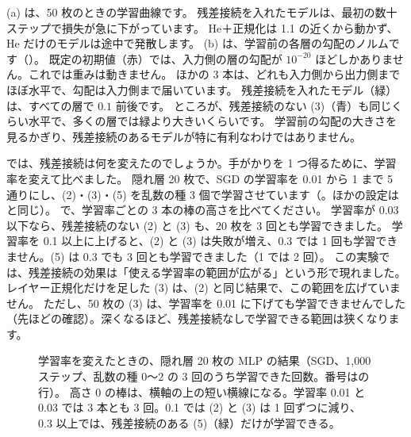 (a) は、50 枚のときの学習曲線です。
残差接続を入れたモデルは、最初の数十ステップで損失が急に下がっています。
He＋正規化は 1.1 の近くから動かず、He だけのモデルは途中で発散します。
(b) は、学習前の各層の勾配のノルムです（）。
既定の初期値（赤）では、入力側の層の勾配が $10^{-20}$ ほどしかありません。これでは重みは動きません。
ほかの 3 本は、どれも入力側から出力側までほぼ水平で、勾配は入力側まで届いています。
残差接続を入れたモデル（緑）は、すべての層で $0.1$ 前後です。
ところが、残差接続のない (3)（青）も同じくらい水平で、多くの層では緑より大きいくらいです。
学習前の勾配の大きさを見るかぎり、残差接続のあるモデルが特に有利なわけではありません。

では、残差接続は何を変えたのでしょうか。手がかりを 1 つ得るために、学習率を変えて比べました。
隠れ層 20 枚で、SGD の学習率を 0.01 から 1 まで 5 通りにし、(2)・(3)・(5) を乱数の種 3 個で学習させています（。ほかの設定はと同じ）。
で、学習率ごとの 3 本の棒の高さを比べてください。
学習率が 0.03 以下なら、残差接続のない (2) と (3) も、20 枚を 3 回とも学習できました。
学習率を 0.1 以上に上げると、(2) と (3) は失敗が増え、0.3 では 1 回も学習できません。(5) は 0.3 でも 3 回とも学習できました（1 では 2 回）。
この実験では、残差接続の効果は「使える学習率の範囲が広がる」という形で現れました。
レイヤー正規化だけを足した (3) は、(2) と同じ結果で、この範囲を広げていません。
ただし、50 枚の (3) は、学習率を 0.01 に下げても学習できませんでした（先ほどの確認）。深くなるほど、残差接続なしで学習できる範囲は狭くなります。

\begin{figure}[tbp]
\centering
{}
\caption{学習率を変えたときの、隠れ層 20 枚の MLP の結果（SGD、1,000 ステップ、乱数の種 0〜2 の 3 回のうち学習できた回数。番号はの行）。
高さ 0 の棒は、横軸の上の短い横線になる。学習率 0.01 と 0.03 では 3 本とも 3 回。0.1 では (2) と (3) は 1 回ずつに減り、0.3 以上では、残差接続のある (5)（緑）だけが学習できる。}
\label{fig:training-sweep-lr}
\end{figure}

